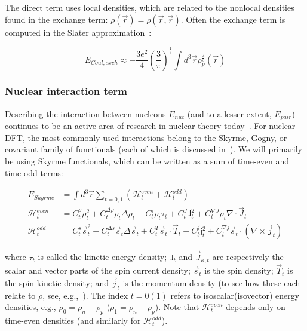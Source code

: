 \noindent The direct term uses local densities, which are related to the nonlocal densities found in the exchange term: $\rho(\vec{r}) = \rho(\vec{r},\vec{r})$. Often the exchange term is computed in the Slater approximation~\cite{Slater1951, TitinSchnaider1974}:

\begin{equation}
E_{Coul, exch} \approx -\frac{3e^2}{4} \left(\frac{3}{\pi}\right)^\frac{1}{3} \int d^3\vec{r} \rho_p^\frac{4}{3}(\vec{r})
\end{equation}

\subsubsection{Nuclear interaction term}
Describing the interaction between nucleons $E_{nuc}$ (and to a lesser extent, $E_{pair}$) continues to be an active area of research in nuclear theory today~\cite{Machleidt2011,Machleidt2016,Epelbaum2009,Detmold2015,Stroberg2019}. For nuclear DFT, the most commonly-used interactions belong to the Skyrme, Gogny, or covariant family of functionals (each of which is discussed in~\cite{bender2003}). We will primarily be using Skyrme functionals, which can be written as a sum of time-even and time-odd terms:

\begin{align}
E_{Skyrme} &= \int d^3\vec{r} \sum_{t=0,1} \left( \mathcal{H}^{even}_t + \mathcal{H}^{odd}_t \right)\\
\mathcal{H}^{even}_t &= C^\rho_t\rho_t^2 + C_t^{\Delta\rho}\rho_t\Delta\rho_t + C^\tau_t\rho_t\tau_t + C^J_t\mathsf{J}^2_t + C^{\nabla J}_t\rho_t\nabla\cdot\vec{J}_t \\
\mathcal{H}^{odd}_t &= C^s_t \vec{s}_t^2 + C_t^{\Delta s}\vec{s}_t\Delta\vec{s}_t + C^T_t\vec{s}_t\cdot\vec{T}_t + C^j_t\mathsf{j}^2_t + C^{\nabla j}_t\vec{s}_t\cdot(\nabla\times\vec{j}_t)
\end{align}

\noindent where $\tau_t$ is called the kinetic energy density; $\mathsf{J}_t$ and $\vec{J}_{\kappa,t}$ are respectively the scalar and vector parts of the spin current density; $\vec{s}_t$ is the spin density; $\vec{T}_t$ is the spin kinetic density; and $\vec{j}_t$ is the momentum density (to see how these each relate to $\rho$, see, e.g.,~\cite{bender2003}). The index $t=0(1)$ refers to isoscalar(isovector) energy densities, e.g., $\rho_0 = \rho_n + \rho_p$ ($\rho_1 = \rho_n - \rho_p$). Note that $\mathcal{H}^{even}_t$ depends only on time-even densities (and similarly for $\mathcal{H}^{odd}_t$).


